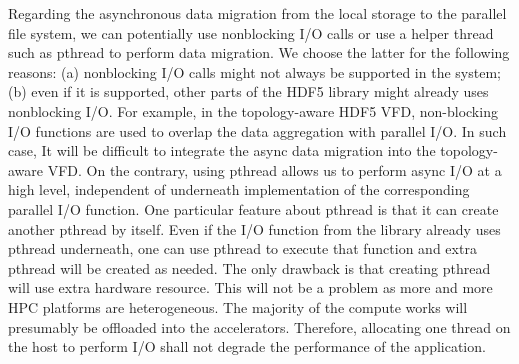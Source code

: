 \documentclass[aps, rmp, 11pt, notitlepage]{revtex4-1}
\begin{document}
Regarding the asynchronous data migration from the local storage to the parallel file system, we can potentially use nonblocking I/O calls or use a helper thread such as pthread to perform data migration. We choose the latter for the following reasons: (a) nonblocking I/O calls might not always be supported in the system; (b) even if it is supported, other parts of the HDF5 library might already uses nonblocking I/O. For example, in the topology-aware HDF5 VFD, non-blocking I/O functions are used to overlap the data aggregation with parallel I/O. In such case, It will be difficult to integrate the async data migration into the topology-aware VFD. On the contrary, using pthread allows us to perform async I/O at a high level, independent of underneath implementation of the corresponding parallel I/O function. One particular feature about pthread is that it can create another pthread by itself. Even if the I/O function from the library already uses pthread underneath, one can use pthread to execute that function and extra pthread will be created as needed. The only drawback is that creating pthread will use extra hardware resource. This will not be a problem as more and more HPC platforms are heterogeneous. The majority of the compute works will presumably be offloaded into the accelerators. Therefore, allocating one thread on the host to perform I/O shall not degrade the performance of the application. 

\end{document}
